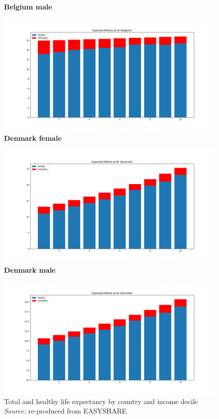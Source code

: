 \begin{figure}[H]
 \endminipage\hfill
{}
\centering \textbf{Belgium male}\par\medskip
  \includegraphics[width=\linewidth]{images/new_results/Belgium_1_m.png}
\endminipage\hfill
{}
\centering \textbf{Denmark female}\par\medskip
  \includegraphics[width=\linewidth]{images/new_results/Denmark_1_f.png}
 \endminipage\hfill
{}
\centering \textbf{Denmark male}\par\medskip
  \includegraphics[width=\linewidth]{images/new_results/Denmark_1_m.png}
\endminipage\hfill
\captionsetup{justification=centering}
\caption{Total and healthy life expectancy by country and income decile \\ \textit{Source:} re-produced from EASYSHARE}
\end{figure}



